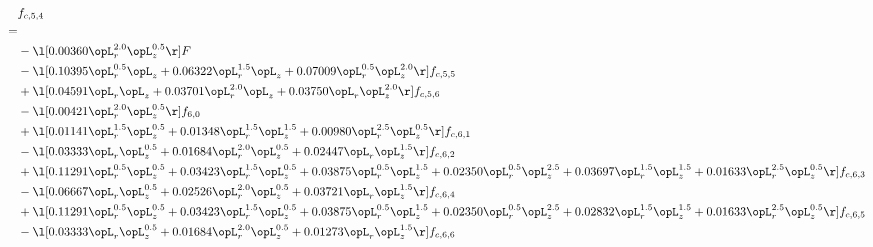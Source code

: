 \begin{alignat}{2} 
\label{eq:f_54_2} 
& f_{c,5,4} \nonumber \\ 
 = \\ 
& - \l[  0.00360 \opL_r^{2.0} \opL_z^{0.5}  \r] F \nonumber \\ 
& - \l[  0.10395 \opL_r^{0.5} \opL_z +  0.06322 \opL_r^{1.5} \opL_z +  0.07009 \opL_r^{0.5} \opL_z^{2.0}  \r] f_{c,5,5} \nonumber \\ 
& + \l[  0.04591 \opL_r \opL_z +  0.03701 \opL_r^{2.0} \opL_z +  0.03750 \opL_r \opL_z^{2.0}  \r] f_{c,5,6} \nonumber \\ 
& - \l[  0.00421 \opL_r^{2.0} \opL_z^{0.5}  \r] f_{6,0} \nonumber \\ 
& + \l[  0.01141 \opL_r^{1.5} \opL_z^{0.5} +  0.01348 \opL_r^{1.5} \opL_z^{1.5} +  0.00980 \opL_r^{2.5} \opL_z^{0.5}  \r] f_{c,6,1} \nonumber \\ 
& - \l[  0.03333 \opL_r \opL_z^{0.5} +  0.01684 \opL_r^{2.0} \opL_z^{0.5} +  0.02447 \opL_r \opL_z^{1.5}  \r] f_{c,6,2} \nonumber \\ 
& + \l[  0.11291 \opL_r^{0.5} \opL_z^{0.5} +  0.03423 \opL_r^{1.5} \opL_z^{0.5} +  0.03875 \opL_r^{0.5} \opL_z^{1.5} +  0.02350 \opL_r^{0.5} \opL_z^{2.5} +  0.03697 \opL_r^{1.5} \opL_z^{1.5} +  0.01633 \opL_r^{2.5} \opL_z^{0.5}  \r] f_{c,6,3} \nonumber \\ 
& - \l[  0.06667 \opL_r \opL_z^{0.5} +  0.02526 \opL_r^{2.0} \opL_z^{0.5} +  0.03721 \opL_r \opL_z^{1.5}  \r] f_{c,6,4} \nonumber \\ 
& + \l[  0.11291 \opL_r^{0.5} \opL_z^{0.5} +  0.03423 \opL_r^{1.5} \opL_z^{0.5} +  0.03875 \opL_r^{0.5} \opL_z^{1.5} +  0.02350 \opL_r^{0.5} \opL_z^{2.5} +  0.02832 \opL_r^{1.5} \opL_z^{1.5} +  0.01633 \opL_r^{2.5} \opL_z^{0.5}  \r] f_{c,6,5} \nonumber \\ 
& - \l[  0.03333 \opL_r \opL_z^{0.5} +  0.01684 \opL_r^{2.0} \opL_z^{0.5} +  0.01273 \opL_r \opL_z^{1.5}  \r] f_{c,6,6} \nonumber \\ 
\end{alignat} 


